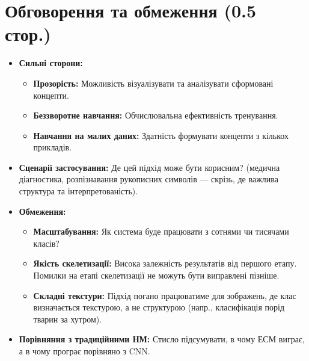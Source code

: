 \documentclass[12pt, a4paper]{article}
\begin{document}
\section{Обговорення та обмеження (0.5 стор.)}
\begin{itemize}
    \item \textbf{Сильні сторони:}
    \begin{itemize}
        \item \textbf{Прозорість:} Можливість візуалізувати та аналізувати сформовані концепти.
        \item \textbf{Беззворотне навчання:} Обчислювальна ефективність тренування.
        \item \textbf{Навчання на малих даних:} Здатність формувати концепти з кількох прикладів.
    \end{itemize}
    \item \textbf{Сценарії застосування:} Де цей підхід може бути корисним? (медична діагностика, розпізнавання рукописних символів — скрізь, де важлива структура та інтерпретованість).
    \item \textbf{Обмеження:}
    \begin{itemize}
        \item \textbf{Масштабування:} Як система буде працювати з сотнями чи тисячами класів?
        \item \textbf{Якість скелетизації:} Висока залежність результатів від першого етапу. Помилки на етапі скелетизації не можуть бути виправлені пізніше.
        \item \textbf{Складні текстури:} Підхід погано працюватиме для зображень, де клас визначається текстурою, а не структурою (напр., класифікація порід тварин за хутром).
    \end{itemize}
    \item \textbf{Порівняння з традиційними НМ:} Стисло підсумувати, в чому ЕСМ виграє, а в чому програє порівняно з CNN.
\end{itemize}
\end{document}
